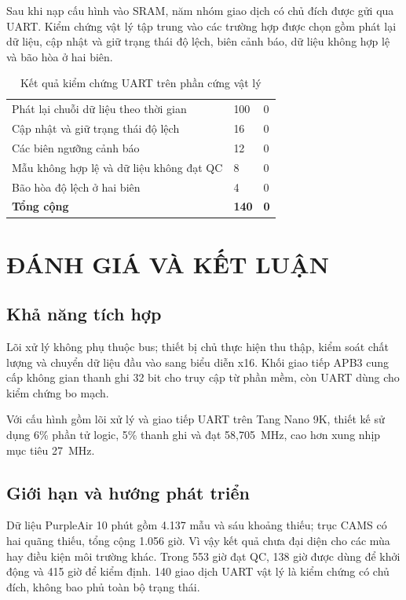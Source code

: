 \documentclass[a4paper,oneside,openany]{extreport}
\begin{document}
Sau khi nạp cấu hình vào SRAM, năm nhóm giao dịch có chủ đích được gửi qua UART. Kiểm chứng vật lý tập trung vào các trường hợp được chọn gồm phát lại dữ liệu, cập nhật và giữ trạng thái độ lệch, biên cảnh báo, dữ liệu không hợp lệ và bão hòa ở hai biên.

\begin{table}[H]
\centering
\caption{Kết quả kiểm chứng UART trên phần cứng vật lý}
\label{tab:board_validation}
\begin{tabularx}{0.88\textwidth}{|Y|C{0.18\textwidth}|C{0.18\textwidth}|}
\hline
{} &  &  \\
\hline
Phát lại chuỗi dữ liệu theo thời gian & 100 & 0 \\
\hline
Cập nhật và giữ trạng thái độ lệch & 16 & 0 \\
\hline
Các biên ngưỡng cảnh báo & 12 & 0 \\
\hline
Mẫu không hợp lệ và dữ liệu không đạt QC & 8 & 0 \\
\hline
Bão hòa độ lệch ở hai biên & 4 & 0 \\
\hline
\textbf{Tổng cộng} & \textbf{140} & \textbf{0} \\
\hline
\end{tabularx}
\end{table}

\chapter{ĐÁNH GIÁ VÀ KẾT LUẬN}

\section{Khả năng tích hợp}
Lõi xử lý không phụ thuộc bus; thiết bị chủ thực hiện thu thập, kiểm soát chất lượng và chuyển dữ liệu đầu vào sang biểu diễn x16. Khối giao tiếp APB3 cung cấp không gian thanh ghi 32 bit cho truy cập từ phần mềm, còn UART dùng cho kiểm chứng bo mạch.

Với cấu hình gồm lõi xử lý và giao tiếp UART trên Tang Nano 9K, thiết kế sử dụng 6\% phần tử logic, 5\% thanh ghi và đạt 58,705~MHz, cao hơn xung nhịp mục tiêu 27~MHz.

\section{Giới hạn và hướng phát triển}
Dữ liệu PurpleAir 10 phút gồm 4.137 mẫu và sáu khoảng thiếu; trục CAMS có hai quãng thiếu, tổng cộng 1.056 giờ. Vì vậy kết quả chưa đại diện cho các mùa hay điều kiện môi trường khác. Trong 553 giờ đạt QC, 138 giờ được dùng để khởi động và 415 giờ để kiểm định. 140 giao dịch UART vật lý là kiểm chứng có chủ đích, không bao phủ toàn bộ trạng thái.
\end{document}
